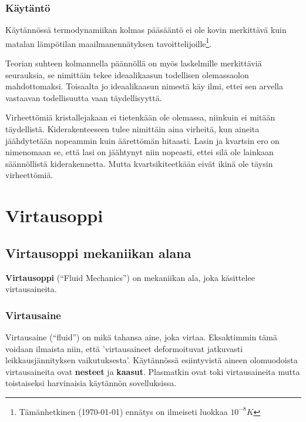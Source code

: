 \documentclass[12pt,a4paper,finnish]{book}
\begin{document}
\section{Käytäntö} %

Käytännössä termodynamiikan kolmas pääsääntö ei ole kovin merkittävä kuin matalan lämpötilan 
maailmanennätyksen tavoittelijoille\footnote{Tämänhetkinen (\today) ennätys on ilmeiseti luokkaa $10^{-8}K$}. 

Teorian suhteen kolmannella päännöllä on myös laskelmille merkittäviä seurauksia, se nimittäin 
tekee ideaalikaasun todellisen olemassaolon mahdottomaksi. Toisaalta jo ideaalikaasun nimestä käy ilmi, 
ettei sen arvella vastaavan todellisuutta vaan täydellisyyttä.

Virheettömiä kristallejakaan ei tietenkään ole olemassa, niinkuin ei mitään täydellistä. Kiderakenteeseen 
tulee nimittäin aina virheitä, kun aineita jäähdytetään nopeammin kuin äärettömän hitaasti. Lasin 
ja kvartsin ero on nimenomaan se, että lasi on jäähtynyt niin nopeasti, ettei silä ole lainkaan säännöllistä 
kiderakennetta. Mutta kvartsikiteetkään eivät ikinä ole täysin virheettömiä.

\part{Virtausoppi} %
\setcounter{chapter}{0}

\chapter{Virtausoppi mekaniikan alana}
\textbf{Virtausoppi} (``Fluid Mechanics'') on mekaniikan ala, joka käsittelee virtausaineita.

\section{Virtausaine}

Virtausaine (``fluid'') on mikä tahansa aine, joka virtaa. Eksaktimmin tämä voidaan ilmaista niin, 
että 'virtausaineet deformoituvat jatkuvasti leikkausjännityksen vaikutuksesta'. Käytännössä esiintyvistä 
aineen olomuodoista virtausaineita ovat \textbf{nesteet} ja \textbf{kaasut}. Plasmatkin ovat toki 
virtausaineita mutta toistaiseksi harvinaisia käytännön sovelluksissa.
\end{document}
